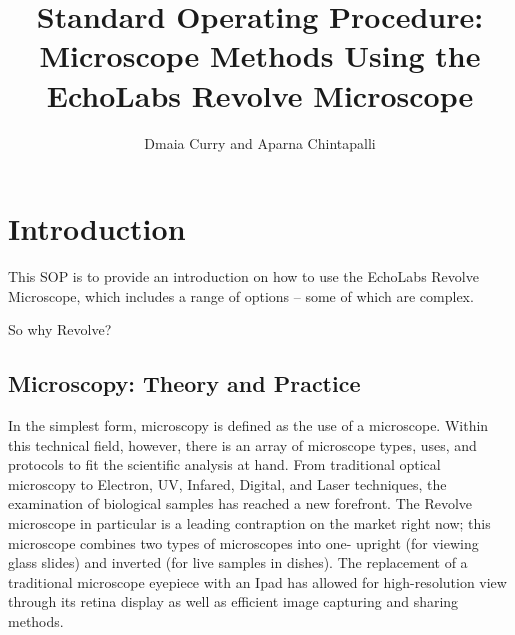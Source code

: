 \documentclass{article}
\title{Standard Operating Procedure: Microscope Methods Using the EchoLabs Revolve Microscope}
\author{Dmaia Curry and Aparna Chintapalli}
\begin{document}


\maketitle

\section{Introduction}

This SOP is to provide an introduction on how to use the EchoLabs Revolve Microscope, which includes a range of options -- some of which are complex.

So why Revolve?

\subsection{Microscopy: Theory and Practice}

In the simplest form, microscopy is defined as the use of a microscope. Within this technical field, however, there is an array of microscope types, uses, and protocols to fit the scientific analysis at hand. From traditional optical microscopy to Electron, UV, Infared, Digital, and Laser techniques, the examination of biological samples has reached a new forefront. The Revolve microscope in particular is a leading contraption on the market right now; this microscope combines two types of microscopes into one- upright (for viewing glass slides) and inverted (for live samples in dishes). The replacement of a traditional microscope eyepiece with an Ipad has allowed for high-resolution view through its retina display as well as efficient image capturing and sharing methods.
\end{document}
